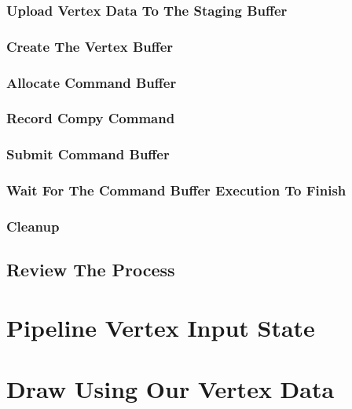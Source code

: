 \subsubsection{Upload Vertex Data To The Staging Buffer}

\subsubsection{Create The Vertex Buffer}

\subsubsection{Allocate Command Buffer}

\subsubsection{Record Compy Command}

\subsubsection{Submit Command Buffer}

\subsubsection{Wait For The Command Buffer Execution To Finish}

\subsubsection{Cleanup}

\subsection{Review The Process}

\section{Pipeline Vertex Input State}

\section{Draw Using Our Vertex Data}
